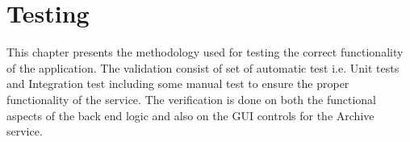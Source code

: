 \chapter{Testing}
This chapter presents the methodology used for testing the correct functionality of the application. The validation consist of set of automatic test i.e.
Unit tests and Integration test including some manual test to ensure the proper functionality of the service. The verification is done on both the functional
aspects of the back end logic and also on the GUI controls for the Archive service.

